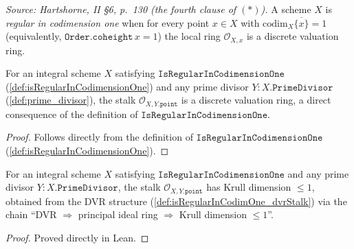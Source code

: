 \begin{definition}
  \label{def:isRegularInCodimensionOne}
  \textit{Source: Hartshorne, II \S6, p.~130 (the fourth clause of \((\ast)\)).}
  A scheme \(X\) is \emph{regular in codimension one} when for every point
  \(x \in X\) with \(\mathrm{codim}_X \overline{\{x\}} = 1\) (equivalently,
  \(\texttt{Order.coheight}\,x = 1\)) the local ring \(\mathcal O_{X,x}\) is
  a discrete valuation ring.
\end{definition}
\begin{definition}

  \label{def:isRegularInCodimOne_dvrStalk}
  For an integral scheme \(X\) satisfying
  \(\texttt{IsRegularInCodimensionOne}\) (\ref{def:isRegularInCodimensionOne})
  and any prime divisor \(Y : X.\texttt{PrimeDivisor}\)
  (\ref{def:prime_divisor}), the stalk
  \(\mathcal O_{X, Y.\texttt{point}}\) is a discrete valuation ring,
  a direct consequence of the definition of \(\texttt{IsRegularInCodimensionOne}\).
\end{definition}
\begin{proof}
  Follows directly from the definition of
  \(\texttt{IsRegularInCodimensionOne}\) (\ref{def:isRegularInCodimensionOne}).
\end{proof}
\begin{definition}

  \label{def:isRegularInCodimOne_krullDimStalk}
  For an integral scheme \(X\) satisfying
  \(\texttt{IsRegularInCodimensionOne}\) and any prime divisor
  \(Y : X.\texttt{PrimeDivisor}\), the stalk
  \(\mathcal O_{X, Y.\texttt{point}}\) has Krull dimension \(\leq 1\), obtained
  from the DVR structure (\ref{def:isRegularInCodimOne_dvrStalk}) via the chain
  ``DVR \(\Rightarrow\) principal ideal ring \(\Rightarrow\) Krull dimension
  \(\leq 1\)''.
\end{definition}
\begin{proof}
  Proved directly in Lean.
\end{proof}
